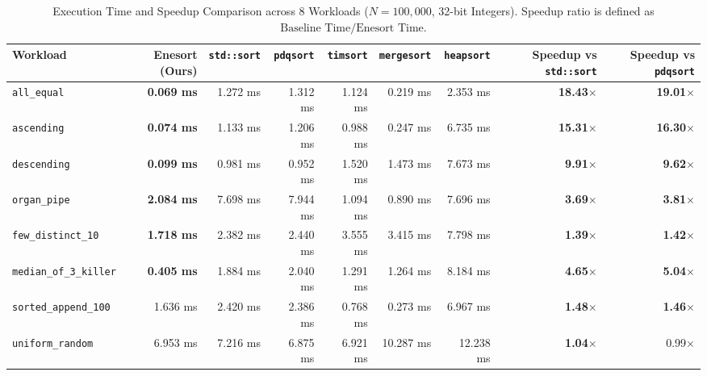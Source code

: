 \documentclass[journal]{IEEEtran}
\begin{document}
\begin{table}[t]
\centering
\caption{Execution Time and Speedup Comparison across 8 Workloads ($N = 100,000$, 32-bit Integers). Speedup ratio is defined as $\text{Baseline Time} / \text{Enesort Time}$.}
\label{tab:main_results}
\begin{tabular}{lrrrrrrrr}
\toprule
Workload & Enesort (Ours) & \texttt{std::sort} & \texttt{pdqsort} & \texttt{timsort} & \texttt{mergesort} & \texttt{heapsort} & Speedup vs \texttt{std::sort} & Speedup vs \texttt{pdqsort} \\
\midrule
\texttt{all\_equal}           & \textbf{0.069 ms}  & 1.272 ms  & 1.312 ms  & 1.124 ms  & 0.219 ms  & 2.353 ms  & \textbf{18.43$\times$} & \textbf{19.01$\times$} \\
\texttt{ascending}            & \textbf{0.074 ms}  & 1.133 ms  & 1.206 ms  & 0.988 ms  & 0.247 ms  & 6.735 ms  & \textbf{15.31$\times$} & \textbf{16.30$\times$} \\
\texttt{descending}           & \textbf{0.099 ms}  & 0.981 ms  & 0.952 ms  & 1.520 ms  & 1.473 ms  & 7.673 ms  & \textbf{9.91$\times$}  & \textbf{9.62$\times$}  \\
\texttt{organ\_pipe}          & \textbf{2.084 ms}  & 7.698 ms  & 7.944 ms  & 1.094 ms  & 0.890 ms  & 7.696 ms  & \textbf{3.69$\times$}  & \textbf{3.81$\times$}  \\
\texttt{few\_distinct\_10}    & \textbf{1.718 ms}  & 2.382 ms  & 2.440 ms  & 3.555 ms  & 3.415 ms  & 7.798 ms  & \textbf{1.39$\times$}  & \textbf{1.42$\times$}  \\
\texttt{median\_of\_3\_killer}& \textbf{0.405 ms}  & 1.884 ms  & 2.040 ms  & 1.291 ms  & 1.264 ms  & 8.184 ms  & \textbf{4.65$\times$}  & \textbf{5.04$\times$}  \\
\texttt{sorted\_append\_100}  & 1.636 ms           & 2.420 ms  & 2.386 ms  & 0.768 ms  & 0.273 ms  & 6.967 ms  & \textbf{1.48$\times$}  & \textbf{1.46$\times$}  \\
\texttt{uniform\_random}      & 6.953 ms           & 7.216 ms  & 6.875 ms  & 6.921 ms  & 10.287 ms & 12.238 ms & \textbf{1.04$\times$}  & 0.99$\times$ \\
\bottomrule
\end{tabular}
\end{table}
\end{document}
